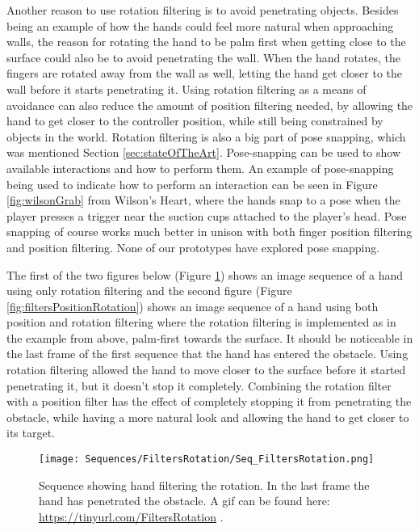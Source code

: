 Another reason to use rotation filtering is to avoid penetrating objects. Besides being an example of how the hands could feel more natural when approaching walls, the reason for rotating the hand to be palm first when getting close to the surface could also be to avoid penetrating the wall. When the hand rotates, the fingers are rotated away from the wall as well, letting the hand get closer to the wall before it starts penetrating it. Using rotation filtering as a means of avoidance can also reduce the amount of position filtering needed, by allowing the hand to get closer to the controller position, while still being constrained by objects in the world. Rotation filtering is also a big part of pose snapping, which was mentioned Section \ref{sec:stateOfTheArt}. Pose-snapping can be used to show available interactions and how to perform them. An example of pose-snapping being used to indicate how to perform an interaction can be seen in Figure \ref{fig:wilsonGrab} from Wilson's Heart, where the hands snap to a pose when the player presses a trigger near the suction cups attached to the player's head. Pose snapping of course works much better in unison with both finger position filtering and position filtering. None of our prototypes have explored pose snapping.

The first of the two figures below (Figure \ref{fig:filtersRotation}) shows an image sequence of a hand using only rotation filtering and the second figure (Figure \ref{fig:filtersPositionRotation}) shows an image sequence of a hand using both position and rotation filtering where the rotation filtering is implemented as in the example from above, palm-first towards the surface. It should be noticeable in the last frame of the first sequence that the hand has entered the obstacle. Using rotation filtering allowed the hand to move closer to the surface before it started penetrating it, but it doesn't stop it completely. Combining the rotation filter with a position filter has the effect of completely stopping it from penetrating the obstacle, while having a more natural look and allowing the hand to get closer to its target.

\begin{figure}[H]
\centering
\texttt{[image: Sequences/FiltersRotation/Seq\_FiltersRotation.png]}
\caption{Sequence showing hand filtering the rotation. In the last frame the hand has penetrated the obstacle. A gif can be found here: \url{https://tinyurl.com/FiltersRotation} .}
\label{fig:filtersRotation}
\end{figure}

